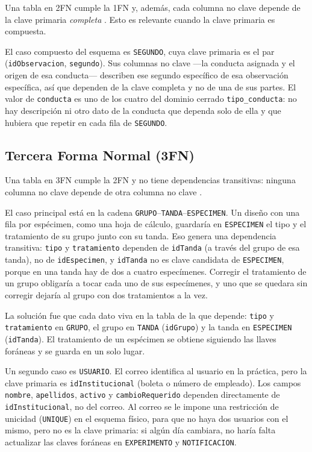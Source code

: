 Una tabla en 2FN cumple la 1FN y, además, cada columna no clave depende de la clave
primaria \emph{completa} \cite{elmasri2015}. Esto es relevante cuando la clave
primaria es compuesta.

El caso compuesto del esquema es \texttt{SEGUNDO}, cuya clave primaria es el par
(\texttt{idObservacion}, \texttt{segundo}). Sus columnas no clave ---la conducta
asignada y el origen de esa conducta--- describen ese segundo específico de esa
observación específica, así que dependen de la clave completa y no de una de sus
partes. El valor de \texttt{conducta} es uno de los cuatro del dominio cerrado
\texttt{tipo\_conducta}: no hay descripción ni otro dato de la conducta que
dependa solo de ella y que hubiera que repetir en cada fila de \texttt{SEGUNDO}.

\subsection{Tercera Forma Normal (3FN)}

Una tabla en 3FN cumple la 2FN y no tiene dependencias transitivas: ninguna columna
no clave depende de otra columna no clave \cite{elmasri2015}.

El caso principal está en la cadena \texttt{GRUPO}--\texttt{TANDA}--\texttt{ESPECIMEN}.
Un diseño con una fila por espécimen, como una hoja de cálculo, guardaría en
\texttt{ESPECIMEN} el tipo y el tratamiento de su grupo junto con su tanda. Eso
genera una dependencia transitiva: \texttt{tipo} y \texttt{tratamiento} dependen
de \texttt{idTanda} (a través del grupo de esa tanda), no de
\texttt{idEspecimen}, y \texttt{idTanda} no es clave candidata de
\texttt{ESPECIMEN}, porque en una tanda hay de dos a cuatro especímenes. Corregir
el tratamiento de un grupo obligaría a tocar cada uno de sus especímenes, y uno que
se quedara sin corregir dejaría al grupo con dos tratamientos a la vez.

La solución fue que cada dato viva en la tabla de la que depende:
\texttt{tipo} y \texttt{tratamiento} en \texttt{GRUPO}, el grupo en
\texttt{TANDA} (\texttt{idGrupo}) y la tanda en \texttt{ESPECIMEN}
(\texttt{idTanda}). El tratamiento de un espécimen se obtiene siguiendo las
llaves foráneas y se guarda en un solo lugar.

Un segundo caso es \texttt{USUARIO}. El correo identifica al usuario en la
práctica, pero la clave primaria es \texttt{idInstitucional} (boleta o número de
empleado). Los campos \texttt{nombre}, \texttt{apellidos}, \texttt{activo} y
\texttt{cambioRequerido} dependen directamente de \texttt{idInstitucional}, no
del correo. Al correo se le impone una restricción de unicidad (\texttt{UNIQUE}) en el esquema
físico, para que no haya dos usuarios con el mismo, pero no es la clave primaria:
si algún día cambiara, no haría falta actualizar las claves foráneas en
\texttt{EXPERIMENTO} y \texttt{NOTIFICACION}.

